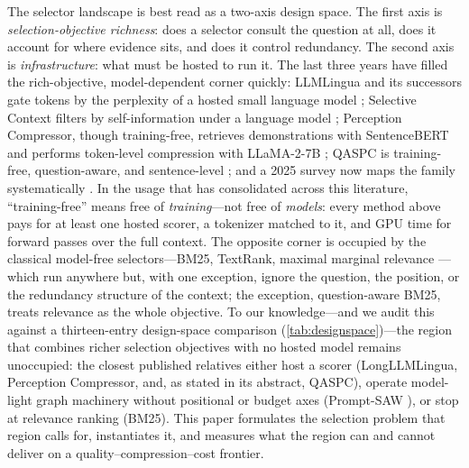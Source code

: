 \documentclass[pdflatex,sn-basic]{sn-jnl}
\theoremstyle{remark}
\begin{document}
The selector landscape is best read as a two-axis design space. The
first axis is \emph{selection-objective richness}: does a selector
consult the question at all, does it account for where evidence sits,
and does it control redundancy. The second axis is
\emph{infrastructure}: what must be hosted to run it. The last three
years have filled the rich-objective, model-dependent corner quickly:
LLMLingua and its successors gate tokens by the perplexity of a hosted
small language model
\citep{jiang2023llmlingua,jiang2023longllmlingua,pan2024llmlingua2};
Selective Context filters by self-information under a language model
\citep{li2023selective}; Perception Compressor, though training-free,
retrieves demonstrations with SentenceBERT and performs token-level
compression with LLaMA-2-7B \citep{tang2025perception}; QASPC is
training-free, question-aware, and sentence-level \citep{chen2025qaspc};
and a 2025 survey now maps the family systematically
\citep{li2025survey}. In the usage that has consolidated across this
literature, ``training-free'' means free of \emph{training}---not free
of \emph{models}: every method above pays for at least one hosted
scorer, a tokenizer matched to it, and GPU time for forward passes over
the full context. The opposite corner is occupied by the classical
model-free selectors---BM25, TextRank, maximal marginal relevance
\citep{robertson2009bm25,mihalcea2004textrank,carbonell1998mmr}---which
run anywhere but, with one exception, ignore the question, the
position, or the redundancy structure of the context; the exception,
question-aware BM25, treats relevance as the whole objective. To our
knowledge---and we audit this against a thirteen-entry design-space
comparison (\autoref{tab:designspace})---the region that combines richer
selection objectives with no hosted model remains unoccupied: the
closest published relatives either host a scorer (LongLLMLingua,
Perception Compressor, and, as stated in its abstract, QASPC), operate
model-light graph machinery without positional or budget axes
(Prompt-SAW \citep{ali2024promptsaw}), or stop at relevance ranking
(BM25). This paper formulates the selection problem that region calls
for, instantiates it, and measures what the region can and cannot
deliver on a quality--compression--cost frontier.
\end{document}
